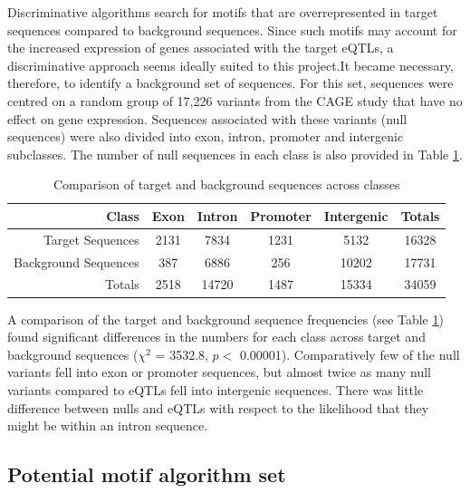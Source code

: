 \documentclass[12pt]{article}
\begin{document}
Discriminative algorithms search for motifs that are overrepresented in target sequences compared to background sequences. Since such motifs may account for the increased expression of genes associated with the target eQTLs, a discriminative approach seems ideally suited to this project.It became necessary, therefore, to identify a background set of sequences. For this set, sequences were centred on a random group of 17,226 variants from the CAGE study that have no effect on gene expression. Sequences associated with these variants (null sequences) were also divided into exon, intron, promoter and intergenic subclasses. The number of null sequences in each class is also provided in Table \ref{freqComparisons}. 

\begin{table}[!htbp]
\centering
\caption{Comparison of target and background sequences across classes}\label{freqComparisons}
\begin{tabular}{r|cccc|c}
\hline
Class & Exon & Intron & Promoter & Intergenic & Totals\\ \hline
Target Sequences & 2131 & 7834 & 1231 & 5132 & 16328\\ \hline
Background Sequences & 387 & 6886 & 256 & 10202 & 17731\\ \hline
Totals & 2518 & 14720 & 1487 & 15334 & 34059
\end{tabular}
\end{table} 

A comparison of the target and background sequence frequencies (see Table \ref{freqComparisons}) found significant differences in the numbers for each class across target and background sequences ($\chi^2$ = 3532.8, $p <$ 0.00001). Comparatively few of the null variants fell into exon or promoter sequences, but almost twice as many null variants compared to eQTLs fell into intergenic sequences. There was little difference between nulls and eQTLs with respect to the likelihood that they might be within an intron sequence.


 
\subsection{Potential motif algorithm set}
\end{document}
